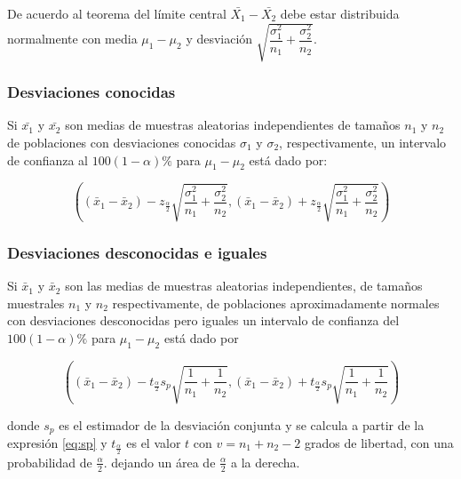 \documentclass[]{book}
\begin{document}
De acuerdo al teorema del límite central \(\bar{X_1}-\bar{X_2}\) debe
estar distribuida normalmente con media \(\mu_1 - \mu_2\) y desviación
\(\sqrt{\dfrac{\sigma_1^2}{n_1} + \dfrac{\sigma_2^2}{n_2}}\).

\subsubsection{Desviaciones conocidas}\label{desviaciones-conocidas}

Si \(\bar{x_1}\) y \(\bar{x_2}\) son medias de muestras aleatorias
independientes de tamaños \(n_1\) y \(n_2\) de poblaciones con
desviaciones conocidas \(\sigma_1\) y \(\sigma_2\), respectivamente, un
intervalo de confianza al \(100\left(1-\alpha\right)\%\) para
\(\mu_1-\mu_2\) está dado por:

\begin{equation} 
\left( \left( \bar{x}_1 - \bar{x}_2 \right) - z_{\frac{\alpha}{2}}\sqrt{\dfrac{\sigma_1^2}{n_1} + \dfrac{\sigma_2^2}{n_2}} , \left( \bar{x}_1 - \bar{x}_2 \right) + z_{\frac{\alpha}{2}}\sqrt{\dfrac{\sigma_1^2}{n_1} + \dfrac{\sigma_2^2}{n_2}} \right) 
\label{eq:ic2msc}
\end{equation}

\subsubsection{Desviaciones desconocidas e
iguales}\label{desviaciones-desconocidas-e-iguales}

Si \(\bar{x}_1\) y \(\bar{x}_2\) son las medias de muestras aleatorias
independientes, de tamaños muestrales \(n_1\) y \(n_2\) respectivamente,
de poblaciones aproximadamente normales con desviaciones desconocidas
pero iguales un intervalo de confianza del
\(100\left(1-\alpha \right)\%\) para \(\mu_1 - \mu_2\) está dado por

\begin{equation} 
\left( \left( \bar{x}_1 - \bar{x}_2 \right) - t_{\frac{\alpha}{2}}s_p\sqrt{\dfrac{1}{n_1} + \dfrac{1}{n_2}} , \left( \bar{x}_1 - \bar{x}_2 \right) + t_{\frac{\alpha}{2}}s_p\sqrt{\dfrac{1}{n_1} + \dfrac{1}{n_2}} \right) 
\label{eq:ic2msd}
\end{equation}

donde \(s_p\) es el estimador de la desviación conjunta y se calcula a
partir de la expresión \eqref{eq:sp} y \(t_{\frac{\alpha}{2}}\) es el
valor \(t\) con \(v=n_1+n_2-2\) grados de libertad, con una probabilidad
de \(\frac{\alpha}{2}\). dejando un área de \(\frac{\alpha}{2}\) a la
derecha.
\end{document}
